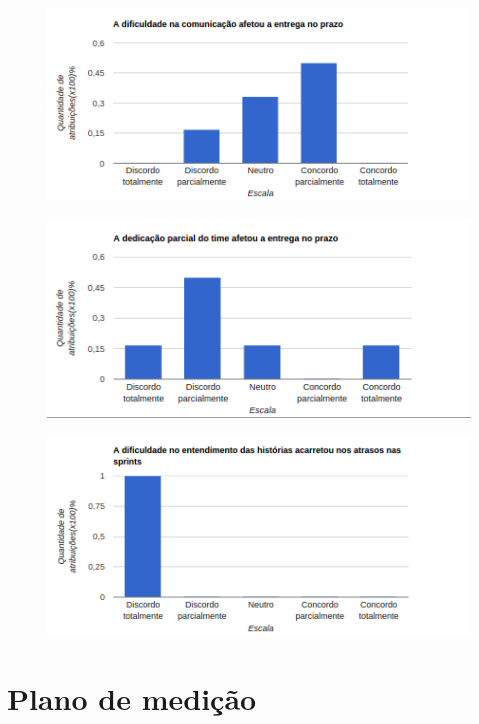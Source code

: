 \begin{apendicesenv}
  			\begin{figure}[!htb]
  			\center
  			\includegraphics[scale=0.9]{figuras/grafico_6.png}
  			\end{figure}
 
  			\begin{figure}[!htb]
  			\center
  			\includegraphics[scale=0.9]{figuras/grafico_7.png}
  			\end{figure}
 
  			\begin{figure}[!htb]
  			\center
  			\includegraphics[scale=0.9]{figuras/grafico_8.png}
  			\end{figure}

	\chapter{Plano de medição}

	  
	      

\end{apendicesenv}
